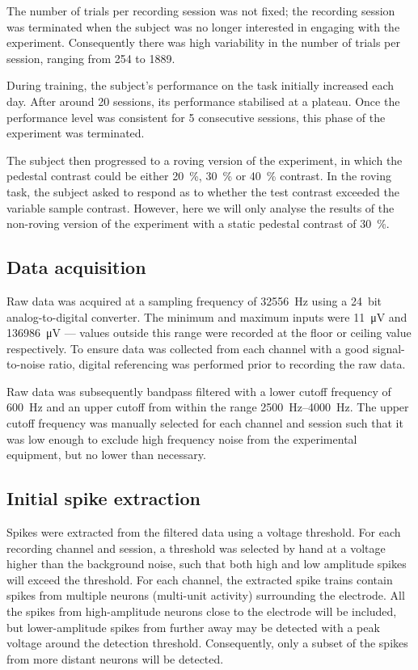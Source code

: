 The number of trials per recording session was not fixed; the recording session was terminated when the subject was no longer interested in engaging with the experiment.
Consequently there was high variability in the number of trials per session, ranging from \num{254} to \num{1889}.

During training, the subject's performance on the task initially increased each day.
After around \num{20} sessions, its performance stabilised at a plateau.
Once the performance level was consistent for \num{5} consecutive sessions, this phase of the experiment was terminated.

The subject then progressed to a roving version of the experiment, in which the pedestal contrast could be either \SI{20}{\percent}, \SI{30}{\percent} or \SI{40}{\percent} contrast.
In the roving task, the subject asked to respond as to whether the test contrast exceeded the variable sample contrast.
However, here we will only analyse the results of the non-roving version of the experiment with a static pedestal contrast of \SI{30}{\percent}.


\subsection{Data acquisition}

Raw data was acquired at a sampling frequency of \SI{32556}{Hz} using a \SI{24}{bit} analog-to-digital converter.
The minimum and maximum inputs were \SI{11}{\micro\volt} and \SI{136986}{\micro\volt} --- values outside this range were recorded at the floor or ceiling value respectively.
To ensure data was collected from each channel with a good signal-to-noise ratio, digital referencing was performed prior to recording the raw data.

Raw data was subsequently bandpass filtered with a lower cutoff frequency of \SI{600}{Hz} and an upper cutoff from within the range \SIrange{2500}{4000}{Hz}.
The upper cutoff frequency was manually selected for each channel and session such that it was low enough to exclude high frequency noise from the experimental equipment, but no lower than necessary.


\subsection{Initial spike extraction}
\label{sec:pl_spike_extraction}

Spikes were extracted from the filtered data using a voltage threshold.
For each recording channel and session, a threshold was selected by hand at a voltage higher than the background noise, such that both high and low amplitude spikes will exceed the threshold.
For each channel, the extracted spike trains contain spikes from multiple neurons (multi-unit activity) surrounding the electrode.
All the spikes from high-amplitude neurons close to the electrode will be included, but lower-amplitude spikes from further away may be detected with a peak voltage around the detection threshold.
Consequently, only a subset of the spikes from more distant neurons will be detected.

